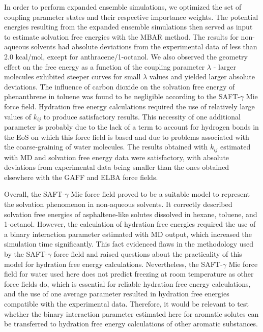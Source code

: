 \documentclass[preprint]{elsarticle}
\begin{document}
	In order to perform expanded ensemble simulations, we optimized the set of coupling parameter states and their respective importance weights. The potential energies resulting from the expanded ensemble simulations then served as input to estimate solvation free energies with the MBAR method. The results for non-aqueous solvents had absolute deviations from the experimental data of less than 2.0 kcal/mol, except for anthracene/1-octanol. We also observed the geometry effect on the free energy as a function of the coupling parameter $\lambda$ - larger molecules exhibited steeper curves for small $\lambda$ values and yielded larger absolute deviations. The influence of carbon dioxide on the solvation free energy of phenanthrene in toluene was found to be negligible according to the SAFT-$\gamma$ Mie force field. Hydration free energy calculations required the use of relatively large values of $k_{ij}$ to produce satisfactory results.
	This necessity of one additional parameter is probably due to the lack of a term to account for hydrogen bonds in the EoS on which this force field is based and due to problems associated with the coarse-graining of water molecules. The results obtained with $k_{ij}$ estimated with MD and solvation free energy data were satisfactory, with absolute deviations from experimental data being smaller than the ones obtained elsewhere with the GAFF and ELBA force fields.

	Overall, the SAFT-$\gamma$ Mie force field proved to be a suitable model to represent the solvation phenomenon in non-aqueous solvents. It correctly described solvation free energies of asphaltene-like solutes dissolved in hexane, toluene, and 1-octanol. However, the calculation of hydration free energies required the use of a binary interaction parameter estimated with MD output, which increased the simulation time significantly. This fact evidenced flaws in the methodology used by the SAFT-$\gamma$ force field and raised questions about the practicality of this model for hydration free energy calculations. Nevertheless, the SAFT-$\gamma$ Mie force field for water used here does not predict freezing at room temperature as other force fields do, which is essential for reliable hydration free energy calculations, and the use of one average parameter resulted in hydration free energies compatible with the experimental data.
	Therefore, it would be relevant to test whether the binary interaction parameter estimated here for aromatic solutes can be transferred to hydration free energy calculations of other aromatic substances.
\end{document}
